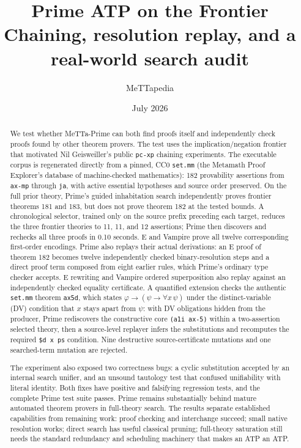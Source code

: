 \documentclass[10pt]{article}
\title{\textbf{Prime ATP on the \pcxp{} Frontier}\\
\large Chaining, resolution replay, and a real-world search audit}
\author{MeTTapedia}
\date{July 2026}
\newcommand{\Prime}{MeTTa-Prime}
\newcommand{\pcxp}{\texttt{pc-xp}}
\begin{document}
\maketitle

\begin{abstract}
We test whether \Prime{} can both find proofs itself and independently check
proofs found by other theorem provers.  The test uses the
implication/negation frontier that motivated Nil Geisweiller's public \pcxp{}
chaining experiments.  The executable corpus is regenerated directly
from a pinned, CC0 \texttt{set.mm} (the Metamath Proof Explorer's database of
machine-checked mathematics): 182 provability assertions from
\texttt{ax-mp} through \texttt{ja}, with active essential hypotheses and
source order preserved.  On the full prior theory, Prime's guided
inhabitation search independently proves frontier theorems 181 and 183, but
does not prove theorem 182 at the tested bounds.  A chronological selector,
trained only on the source prefix preceding each target, reduces the three
frontier theories to 11, 11, and 12 assertions; Prime then discovers and
rechecks all three proofs in 0.10 seconds.  E and Vampire prove all twelve
corresponding first-order encodings.  Prime also replays
their actual derivations: an E proof of theorem 182 becomes twelve independently
checked binary-resolution steps and a direct proof term composed from eight
earlier rules, which Prime's ordinary type checker accepts.  E rewriting and
Vampire ordered superposition also replay against an independently checked
equality certificate.  A quantified extension checks the authentic
\texttt{set.mm} theorem \texttt{ax5d}, which states
$\varphi\to(\psi\to\forall x\,\psi)$ under the distinct-variable (DV)
condition that $x$ stays apart from $\psi$: with DV obligations hidden from
the producer, Prime rediscovers the constructive core \texttt{(a1i ax-5)}
within a two-assertion selected theory, then a source-level replayer infers
the substitutions and recomputes the required \texttt{\$d x ps} condition.
Nine destructive source-certificate mutations and one searched-term mutation
are rejected.

The experiment also exposed two correctness bugs: a cyclic substitution
accepted by an internal search unifier, and an unsound tautology test that
confused unifiability with literal identity.  Both fixes have positive and
falsifying regression tests, and the complete Prime test suite passes.  Prime
remains substantially behind mature automated theorem provers in full-theory
search.  The results separate established capabilities from remaining work:
proof checking and interchange succeed; small native resolution works; direct
search has useful classical pruning; full-theory saturation still needs the
standard redundancy and scheduling machinery that makes an ATP an ATP.
\end{abstract}
\end{document}
